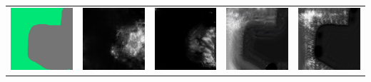 \documentclass[twocolumn]{article}
\begin{document}
\begin{table}[t]
\begin{tabular}{c|c|c|c|c}
 				\includegraphics[width=0.25\columnwidth]{10.png} & \includegraphics[width=0.25\columnwidth]{11.png} & \includegraphics[width=0.25\columnwidth]{12.png} & \includegraphics[width=0.25\columnwidth]{13.png} & \includegraphics[width=0.25\columnwidth]{14.png} \\

\end{tabular}
\end{table}
\end{document}
